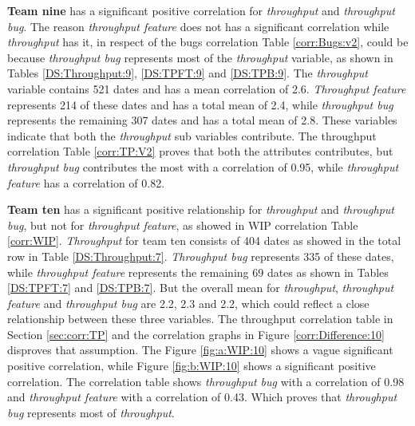 \documentclass[UKenglish]{ifimaster}  %
\begin{document}
\textbf{Team nine} has a significant positive correlation for \textit{throughput} and \textit{throughput bug}. The reason \textit{throughput feature} does not has a significant correlation while \textit{throughput} has it, in respect of the bugs correlation Table \ref{corr:Bugs:v2}, could be because \textit{throughput bug} represents most of the \textit{throughput} variable, as shown in Tables \ref{DS:Throughput:9}, \ref{DS:TPFT:9} and \ref{DS:TPB:9}. The \textit{throughput} variable contains 521 dates and has a mean correlation of 2.6. \textit{Throughput feature} represents 214 of these dates and has a total mean of 2.4, while \textit{throughput bug} represents the remaining 307 dates and has a total mean of 2.8. These variables indicate that both the \textit{throughput} sub variables contribute. The throughput correlation Table \ref{corr:TP:V2} proves that both the attributes contributes, but \textit{throughput bug} contributes the most with a correlation of 0.95, while \textit{throughput feature} has a correlation of 0.82. 


\textbf{Team ten} has a significant positive relationship for \textit{throughput} and \textit{throughput bug}, but not for \textit{throughput feature}, as showed in WIP correlation Table \ref{corr:WIP}. \textit{Throughput} for team ten consists of 404 dates as showed in the total row in Table \ref{DS:Throughput:7}. \textit{Throughput bug} represents 335 of these dates, while \textit{throughput feature} represents the remaining 69 dates as shown in Tables \ref{DS:TPFT:7} and \ref{DS:TPB:7}. But the overall mean for \textit{throughput}, \textit{throughput feature} and \textit{throughput bug} are 2.2, 2.3 and 2.2, which could reflect a close relationship between these three variables. The throughput correlation table in Section \ref{sec:corr:TP} and the correlation graphs in Figure \ref{corr:Difference:10} disproves that assumption. The Figure \ref{fig:a:WIP:10} shows a vague significant positive correlation, while Figure \ref{fig:b:WIP:10} shows a significant positive correlation. The correlation table shows  \textit{throughput bug} with a correlation of 0.98 and \textit{throughput feature} with a correlation of 0.43.  Which proves that \textit{throughput bug} represents most of \textit{throughput}. 
\end{document}
